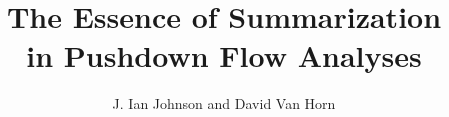 \documentclass[article]{llncs}
\begin{document}
\title{The Essence of Summarization\\ in Pushdown Flow Analyses}
\author{J. Ian Johnson and David Van Horn}


\maketitle

\begin{abstract}

\end{abstract}







\appendix{}
\end{document}
